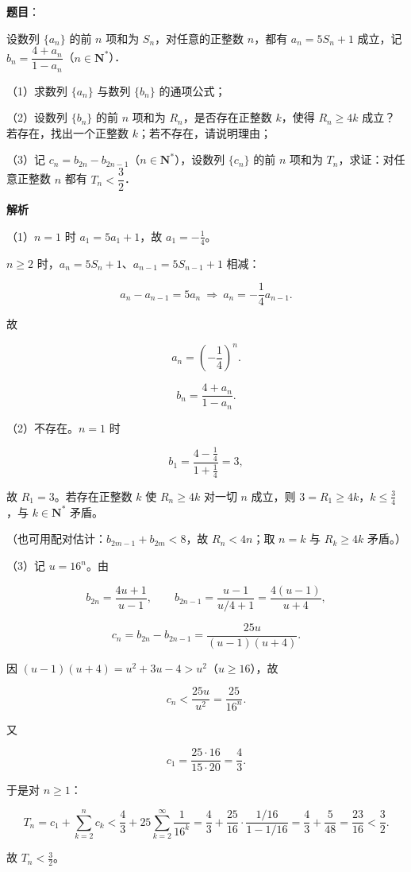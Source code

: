 \begin{answer}

\textbf{题目}：

设数列 $\{a_n\}$ 的前 $n$ 项和为 $S_n$，对任意的正整数 $n$，都有 $a_n=5S_n+1$ 成立，记 $b_n=\dfrac{4+a_n}{1-a_n}$（$n\in\mathbf N^*$）．

（1）求数列 $\{a_n\}$ 与数列 $\{b_n\}$ 的通项公式；

（2）设数列 $\{b_n\}$ 的前 $n$ 项和为 $R_n$，是否存在正整数 $k$，使得 $R_n\geqslant4k$ 成立？若存在，找出一个正整数 $k$；若不存在，请说明理由；

（3）记 $c_n=b_{2n}-b_{2n-1}$（$n\in\mathbf N^*$），设数列 $\{c_n\}$ 的前 $n$ 项和为 $T_n$，求证：对任意正整数 $n$ 都有 $T_n<\dfrac32$．

\textbf{解析}

（1）$n=1$ 时 $a_1=5a_1+1$，故 $a_1=-\frac14$。

$n\geqslant2$ 时，$a_n=5S_n+1$、$a_{n-1}=5S_{n-1}+1$ 相减：

\nopagebreak[4]
\[a_n-a_{n-1}=5a_n\ \Longrightarrow\ a_n=-\frac14a_{n-1}.\]

故

\nopagebreak[4]
\[a_n=\left(-\frac14\right)^n .\]

\nopagebreak[4]
\[b_n=\frac{4+a_n}{1-a_n}.\]

（2）不存在。$n=1$ 时

\nopagebreak[4]
\[b_1=\frac{4-\frac14}{1+\frac14}=3,\]

故 $R_1=3$。若存在正整数 $k$ 使 $R_n\geqslant4k$ 对一切 $n$ 成立，则 $3=R_1\geqslant4k$，$k\leqslant\frac34$，与 $k\in\mathbf N^*$ 矛盾。

（也可用配对估计：$b_{2m-1}+b_{2m}<8$，故 $R_n<4n$；取 $n=k$ 与 $R_k\geqslant4k$ 矛盾。）

（3）记 $u=16^n$。由

\nopagebreak[4]
\[b_{2n}=\frac{4u+1}{u-1},\qquad
b_{2n-1}=\frac{u-1}{u/4+1}=\frac{4(u-1)}{u+4},\]

\nopagebreak[4]
\[c_n=b_{2n}-b_{2n-1}
=\frac{25u}{(u-1)(u+4)}.\]

因 $(u-1)(u+4)=u^2+3u-4>u^2$（$u\geqslant16$），故

\nopagebreak[4]
\[c_n<\frac{25u}{u^2}=\frac{25}{16^n}.\]

又

\nopagebreak[4]
\[c_1=\frac{25\cdot16}{15\cdot20}=\frac43 .\]

于是对 $n\geqslant1$：

\nopagebreak[4]
\[T_n=c_1+\sum_{k=2}^{n}c_k
<\frac43+25\sum_{k=2}^{\infty}\frac1{16^k}
=\frac43+\frac{25}{16}\cdot\frac{1/16}{1-1/16}
=\frac43+\frac{5}{48}
=\frac{23}{16}<\frac32 .\]

故 $T_n<\frac32$。


\end{answer}